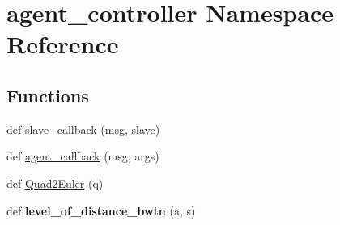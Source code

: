 \hypertarget{namespaceagent__controller}{}\section{agent\+\_\+controller Namespace Reference}
\label{namespaceagent__controller}
\subsection*{Functions}
\begin{DoxyCompactItemize}
\item 
def \hyperlink{namespaceagent__controller_a5543c9bb238164e273f7500b92d09d20}{slave\+\_\+callback} (msg, slave)
\item 
def \hyperlink{namespaceagent__controller_a42656b08b67869c193f0cab8be00a83d}{agent\+\_\+callback} (msg, args)
\item 
def \hyperlink{namespaceagent__controller_a2a75c52da3a09e2b598dd55a4d4436ec}{Quad2\+Euler} (q)
\item 
\mbox{\label{namespaceagent__controller_a4cc68e29b1a4d4c48f6f8a2f2da6c0d5}} 
def {\bfseries level\+\_\+of\+\_\+distance\+\_\+bwtn} (a, s)
\end{DoxyCompactItemize}
